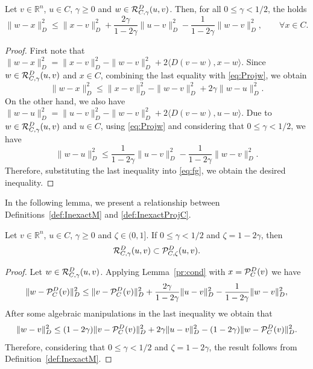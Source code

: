 \begin{lemma} \label{pr:cond}
	Let $v \in {\mathbb R}^n$, $u \in C$, $\gamma \geq 0$ and $w\in {\cal R}_{C,\gamma}^{D}(u, v)$. Then,  for all $0 \leq \gamma <1/2$, the holds
	$$
		\displaystyle \|w-x\|_{D}^2 \leq \|x-v\|_{D}^2 + \frac{2\gamma}{1-2\gamma}\|u-v\|_{D}^2- \frac{1}{1-2\gamma}\|w-v\|_{D}^2, \qquad \forall x \in C.
	$$
\end{lemma}
\begin{proof}
	First note that $\|w-x\|_{D}^2 = \|x-v\|_{D}^2 - \|w-v\|_{D}^2 + 2 \langle D(v-w), x-w \rangle$. Since $w \in {\cal R}_{C,\gamma}^{D}(u, v)$ and $x \in C$, combining the last equality with \eqref{eq:Projw}, we obtain
	\begin{equation} \label{eq:fg}
		\|w-x\|_{D}^2 \leq \|x-v\|_{D}^2 - \|w-v\|_{D}^2  + 2\gamma \|w-u\|_{D}^2.
	\end{equation}
	On the other hand, we also have $\|w-u\|_{D}^2=\|u-v\|_{D}^2 - \|w-v\|_{D}^2 +  2 \langle D(v-w), u-w \rangle$. Due to $w\in {\cal R}_{C,\gamma}^{D}(u, v)$ and $u \in C$, using \eqref{eq:Projw} and considering that  $0 \leq \gamma < 1/2$, we have
	$$
		\|w-u\|_{D}^2 \leq \frac{1}{1-2\gamma}\|u-v\|_{D}^2 - \frac{1}{1-2\gamma} \|w-v\|_{D}^2.
	$$
	Therefore, substituting the last inequality into   \eqref{eq:fg}, we obtain the  desired inequality.
\end{proof}

In the following  lemma, we present a  relationship between   Definitions~\ref{def:InexactM} and \ref{def:InexactProjC}.
\begin{lemma} \label{pr:condrip}
	Let $v \in {\mathbb R}^n$, $u \in C$, $\gamma \geq 0$  and $\zeta\in (0, 1]$.  If  $0 \leq \gamma <1/2$ and $\zeta=1-2\gamma$, then
	$$
		{\cal R}_{C,\gamma}^{D}(u, v) \subset {\cal P}_{C,\zeta}^{D}(u, v).
	$$
\end{lemma}
\begin{proof}
	Let $w\in {\cal R}_{C,\gamma}^{D}(u, v)$. Applying Lemma~\ref{pr:cond} with  $x={\cal P}_{C}^{D}(v)$ we have
	$$
		\|w-{\cal P}_{C}^{D}(v)\|_{D}^2 \leq \|v-{\cal P}_{C}^{D}(v)\|_{D}^2 + \frac{2\gamma}{1-2\gamma}\|u-v\|_{D}^2- \frac{1}{1-2\gamma}\|w-v\|_{D}^2,
	$$
	After some algebraic manipulations in the last inequality we obtain that
	$$
		\|w-v\|_{D}^2 \leq (1-2\gamma)\|v-{\cal P}_{C}^{D}(v)\|_{D}^2 + 2\gamma\|u-v\|_{D}^2- (1-2\gamma)\|w-{\cal P}_{C}^{D}(v)\|_{D}^2.
	$$
	Therefore, considering that  $0 \leq \gamma <1/2$ and $\zeta=1-2\gamma$, the result follows from Definition~\ref{def:InexactM}.
\end{proof}

